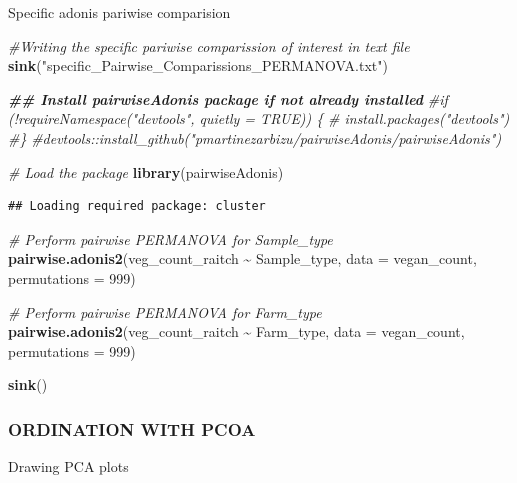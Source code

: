 \documentclass[
]{article}
\newenvironment{Shaded}{\begin{snugshade}}{\end{snugshade}}
\newcommand{\AttributeTok}[1]{\textcolor[rgb]{0.13,0.29,0.53}{#1}}
\newcommand{\CommentTok}[1]{\textcolor[rgb]{0.56,0.35,0.01}{\textit{#1}}}
\newcommand{\DecValTok}[1]{\textcolor[rgb]{0.00,0.00,0.81}{#1}}
\newcommand{\DocumentationTok}[1]{\textcolor[rgb]{0.56,0.35,0.01}{\textbf{\textit{#1}}}}
\newcommand{\FunctionTok}[1]{\textcolor[rgb]{0.13,0.29,0.53}{\textbf{#1}}}
\newcommand{\NormalTok}[1]{#1}
\newcommand{\SpecialCharTok}[1]{\textcolor[rgb]{0.81,0.36,0.00}{\textbf{#1}}}
\newcommand{\StringTok}[1]{\textcolor[rgb]{0.31,0.60,0.02}{#1}}
\begin{document}
Specific adonis pariwise comparision

\begin{Shaded}
\begin{Highlighting}[]
\CommentTok{\#Writing the specific pariwise comparission of interest in text file}
\FunctionTok{sink}\NormalTok{(}\StringTok{"specific\_Pairwise\_Comparissions\_PERMANOVA.txt"}\NormalTok{)}

\DocumentationTok{\#\# Install pairwiseAdonis package if not already installed}
\CommentTok{\#if (!requireNamespace("devtools", quietly = TRUE)) \{}
\CommentTok{\# install.packages("devtools")}
\CommentTok{\#\}}
\CommentTok{\#devtools::install\_github("pmartinezarbizu/pairwiseAdonis/pairwiseAdonis")}

\CommentTok{\# Load the package}
\FunctionTok{library}\NormalTok{(pairwiseAdonis)}
\end{Highlighting}
\end{Shaded}

\begin{verbatim}
## Loading required package: cluster
\end{verbatim}

\begin{Shaded}
\begin{Highlighting}[]
\CommentTok{\# Perform pairwise PERMANOVA for Sample\_type}
\FunctionTok{pairwise.adonis2}\NormalTok{(veg\_count\_raitch }\SpecialCharTok{\textasciitilde{}}\NormalTok{ Sample\_type, }\AttributeTok{data =}\NormalTok{ vegan\_count, }\AttributeTok{permutations =} \DecValTok{999}\NormalTok{)}

\CommentTok{\# Perform pairwise PERMANOVA for Farm\_type}
\FunctionTok{pairwise.adonis2}\NormalTok{(veg\_count\_raitch }\SpecialCharTok{\textasciitilde{}}\NormalTok{ Farm\_type, }\AttributeTok{data =}\NormalTok{ vegan\_count, }\AttributeTok{permutations =} \DecValTok{999}\NormalTok{)}


\FunctionTok{sink}\NormalTok{()}
\end{Highlighting}
\end{Shaded}

\subsubsection{ORDINATION WITH PCOA}\label{ordination-with-pcoa}

Drawing PCA plots
\end{document}
